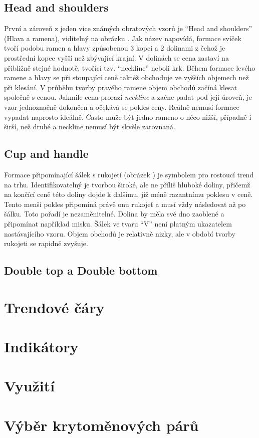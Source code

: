 \subsection{Head and shoulders}
První a zároveň z jeden více známých obratových vzorů je \enquote{Head and shoulders} (Hlava a ramena), viditelný na obrázku \iffalse TODO: Dat obrazek \fi. Jak název napovídá, formace svíček tvoří podobu ramen a hlavy způsobenou
3 kopci a 2 dolinami z čehož je prostřední kopec vyšší než zbývající krajní. V dolinách se cena zastaví na přibližně stejné hodnotě, tvořící tzv. \enquote{neckline} neboli krk.
Během formace levého ramene a hlavy se při stoupající ceně taktéž obchoduje ve vyšších objemech než při klesání. V průběhu tvorby pravého ramene objem obchodů začíná klesat společně s cenou.
Jakmile cena prorazí \emph{neckline} a začne padat pod její úroveň, je vzor jednoznačně dokončen a očekává se pokles ceny. Reálně nemusí formace vypadat naprosto ideálně. Často
může být jedno rameno o něco nižší, případně i širší, než druhé a neckline nemusí být skvěle zarovnaná.


\subsection{Cup and handle}
Formace připomínající šálek s rukojetí (obrázek \iffalse TODO: Ref na obrazek \fi) je symbolem pro rostoucí trend na trhu. Identifikovatelný je tvorbou široké, ale ne příliš hluboké doliny, přičemž na končící ceně této doliny dojde k
dalšímu, již méně razantnímu poklesu v ceně. Tento menší pokles připomíná právě onu rukojeť a musí vždy následovat až po šálku. Toto pořadí je nezaměnitelné. Dolina by měla své dno
zaoblené a připomínat například misku. Šálek ve tvaru \enquote{V} není platným ukazatelem nastávajícího vzoru. Objem obchodů je relativně nizky, ale v období tvorby rukojeti se rapidně zvyšuje.



\subsection{Double top a Double bottom}



\section{Trendové čáry}
\label{sec:TrendingLines}


\section{Indikátory}
\label{sec:Indicators}

\section{Využití}

\section{Výběr krytoměnových párů}
\label{sec:ChoosingCryptopairs}

\endinput